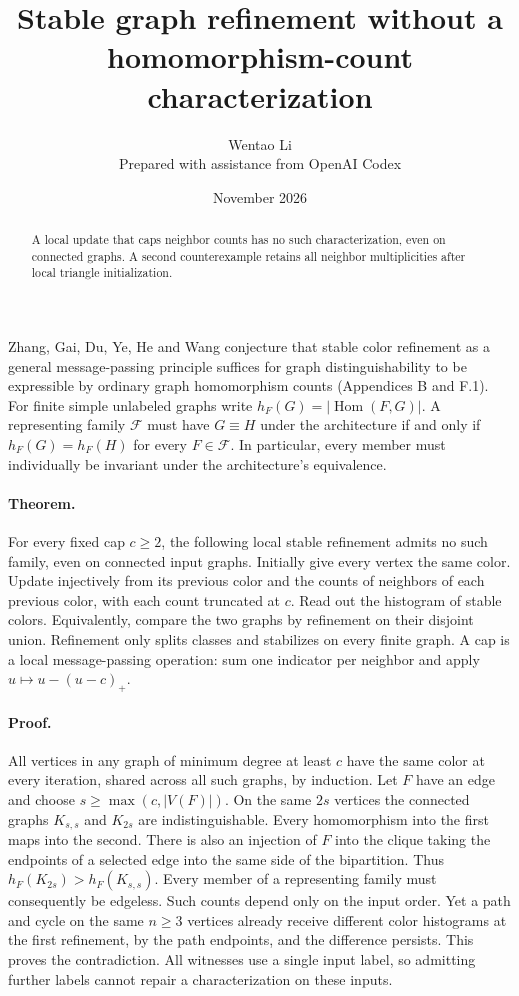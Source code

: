 \documentclass[10pt]{article}
\title{Stable graph refinement without a homomorphism-count characterization}
\author{Wentao Li\\{\small Prepared with assistance from OpenAI Codex}}
\date{November 2026}
\begin{document}
\maketitle
\begin{abstract}
A local update that caps neighbor counts has no such characterization, even on connected graphs. A second counterexample retains all neighbor multiplicities after local triangle initialization.
\end{abstract}
Zhang, Gai, Du, Ye, He and Wang conjecture that stable color refinement as a general message-passing principle suffices for graph distinguishability to be expressible by ordinary graph homomorphism counts (Appendices B and F.1). For finite simple unlabeled graphs write $h_F(G)=|\operatorname{Hom}(F,G)|$. A representing family $\mathcal F$ must have $G\equiv H$ under the architecture if and only if $h_F(G)=h_F(H)$ for every $F\in\mathcal F$. In particular, every member must individually be invariant under the architecture's equivalence.

\paragraph{Theorem.} For every fixed cap $c\ge2$, the following local stable refinement admits no such family, even on connected input graphs. Initially give every vertex the same color. Update injectively from its previous color and the counts of neighbors of each previous color, with each count truncated at $c$. Read out the histogram of stable colors. Equivalently, compare the two graphs by refinement on their disjoint union. Refinement only splits classes and stabilizes on every finite graph. A cap is a local message-passing operation: sum one indicator per neighbor and apply $u\mapsto u-(u-c)_+$.

\paragraph{Proof.} All vertices in any graph of minimum degree at least $c$ have the same color at every iteration, shared across all such graphs, by induction. Let $F$ have an edge and choose $s\ge\max(c,|V(F)|)$. On the same $2s$ vertices the connected graphs $K_{s,s}$ and $K_{2s}$ are indistinguishable. Every homomorphism into the first maps into the second. There is also an injection of $F$ into the clique taking the endpoints of a selected edge into the same side of the bipartition. Thus $h_F(K_{2s})>h_F(K_{s,s})$. Every member of a representing family must consequently be edgeless. Such counts depend only on the input order. Yet a path and cycle on the same $n\ge3$ vertices already receive different color histograms at the first refinement, by the path endpoints, and the difference persists. This proves the contradiction. All witnesses use a single input label, so admitting further labels cannot repair a characterization on these inputs.
\end{document}
